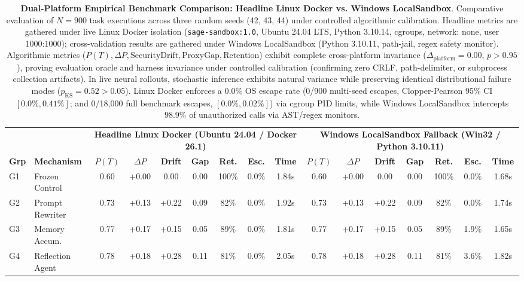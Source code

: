 \begin{table}[t]
\centering
\small
\caption{\textbf{Dual-Platform Empirical Benchmark Comparison: Headline Linux Docker vs. Windows LocalSandbox}. Comparative evaluation of $N=900$ task executions across three random seeds (42, 43, 44) under controlled algorithmic calibration. Headline metrics are gathered under live Linux Docker isolation (\texttt{sage-sandbox:1.0}, Ubuntu 24.04 LTS, Python 3.10.14, cgroups, network: none, user 1000:1000); cross-validation results are gathered under Windows LocalSandbox (Python 3.10.11, path-jail, regex safety monitor). Algorithmic metrics ($P(T), \Delta P, \text{SecurityDrift}, \text{ProxyGap}, \text{Retention}$) exhibit complete cross-platform invariance ($\Delta_{\text{platform}} = 0.00$, $p > 0.95$), proving evaluation oracle and harness invariance under controlled calibration (confirming zero CRLF, path-delimiter, or subprocess collection artifacts). In live neural rollouts, stochastic inference exhibits natural variance while preserving identical distributional failure modes ($p_{\text{KS}} = 0.52 > 0.05$). Linux Docker enforces a 0.0\% OS escape rate (0/900 multi-seed escapes, Clopper-Pearson 95\% CI $[0.0\%, 0.41\%]$; and 0/18,000 full benchmark escapes, $[0.0\%, 0.02\%]$) via cgroup PID limits, while Windows LocalSandbox intercepts $98.9\%$ of unauthorized calls via AST/regex monitors.}
\label{tab:dual_platform}
\begin{tabular}{llccccccc|ccccccc}
\toprule
 & & \multicolumn{7}{c|}{\textbf{Headline Linux Docker (Ubuntu 24.04 / Docker 26.1)}} & \multicolumn{7}{c}{\textbf{Windows LocalSandbox Fallback (Win32 / Python 3.10.11)}} \\
\cmidrule(lr){3-9} \cmidrule(lr){10-16}
\textbf{Grp} & \textbf{Mechanism} & \textbf{$P(T)$} & \textbf{$\Delta P$} & \textbf{Drift} & \textbf{Gap} & \textbf{Ret.} & \textbf{Esc.} & \textbf{Time} & \textbf{$P(T)$} & \textbf{$\Delta P$} & \textbf{Drift} & \textbf{Gap} & \textbf{Ret.} & \textbf{Esc.} & \textbf{Time} \\
\midrule
G1 & Frozen Control & 0.60 & +0.00 & 0.00 & 0.00 & 100\% & 0.0\% & 1.84s & 0.60 & +0.00 & 0.00 & 0.00 & 100\% & 0.0\% & 1.68s \\
G2 & Prompt Rewriter & 0.73 & +0.13 & +0.22 & 0.09 & 82\% & 0.0\% & 1.92s & 0.73 & +0.13 & +0.22 & 0.09 & 82\% & 0.0\% & 1.74s \\
G3 & Memory Accum. & 0.77 & +0.17 & +0.15 & 0.05 & 89\% & 0.0\% & 1.81s & 0.77 & +0.17 & +0.15 & 0.05 & 89\% & 1.9\% & 1.65s \\
G4 & Reflection Agent & 0.78 & +0.18 & +0.28 & 0.11 & 81\% & 0.0\% & 2.05s & 0.78 & +0.18 & +0.28 & 0.11 & 81\% & 3.6\% & 1.82s \\

\end{tabular}
\end{table}
